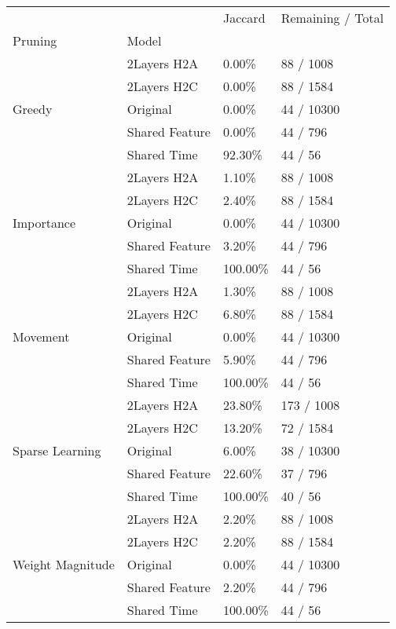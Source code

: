\begin{tabular}{llll}
\toprule
 &  & Jaccard & Remaining / Total \\
Pruning & Model &  &  \\
\midrule
\multirow[t]{5}{*}{Greedy} & 2Layers H2A & 0.00\% & 88 / 1008 \\
 & 2Layers H2C & 0.00\% & 88 / 1584 \\
 & Original & 0.00\% & 44 / 10300 \\
 & Shared Feature & 0.00\% & 44 / 796 \\
 & Shared Time & 92.30\% & 44 / 56 \\
\cline{1-4}
\multirow[t]{5}{*}{Importance} & 2Layers H2A & 1.10\% & 88 / 1008 \\
 & 2Layers H2C & 2.40\% & 88 / 1584 \\
 & Original & 0.00\% & 44 / 10300 \\
 & Shared Feature & 3.20\% & 44 / 796 \\
 & Shared Time & 100.00\% & 44 / 56 \\
\cline{1-4}
\multirow[t]{5}{*}{Movement} & 2Layers H2A & 1.30\% & 88 / 1008 \\
 & 2Layers H2C & 6.80\% & 88 / 1584 \\
 & Original & 0.00\% & 44 / 10300 \\
 & Shared Feature & 5.90\% & 44 / 796 \\
 & Shared Time & 100.00\% & 44 / 56 \\
\cline{1-4}
\multirow[t]{5}{*}{Sparse Learning} & 2Layers H2A & 23.80\% & 173 / 1008 \\
 & 2Layers H2C & 13.20\% & 72 / 1584 \\
 & Original & 6.00\% & 38 / 10300 \\
 & Shared Feature & 22.60\% & 37 / 796 \\
 & Shared Time & 100.00\% & 40 / 56 \\
\cline{1-4}
\multirow[t]{5}{*}{Weight Magnitude} & 2Layers H2A & 2.20\% & 88 / 1008 \\
 & 2Layers H2C & 2.20\% & 88 / 1584 \\
 & Original & 0.00\% & 44 / 10300 \\
 & Shared Feature & 2.20\% & 44 / 796 \\
 & Shared Time & 100.00\% & 44 / 56 \\
\cline{1-4}
\bottomrule
\end{tabular}
